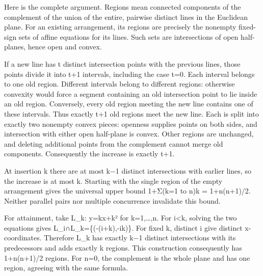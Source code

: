 \documentclass[11pt]{article}
\begin{document}
Here is the complete argument. Regions mean connected components of the complement of the union of the entire, pairwise distinct lines in the Euclidean plane. For an existing arrangement, its regions are precisely the nonempty fixed-sign sets of affine equations for its lines. Such sets are intersections of open half-planes, hence open and convex.

If a new line has t distinct intersection points with the previous lines, those points divide it into t+1 intervals, including the case t=0. Each interval belongs to one old region. Different intervals belong to different regions: otherwise convexity would force a segment containing an old intersection point to lie inside an old region. Conversely, every old region meeting the new line contains one of these intervals. Thus exactly t+1 old regions meet the new line. Each is split into exactly two nonempty convex pieces: openness supplies points on both sides, and intersection with either open half-plane is convex. Other regions are unchanged, and deleting additional points from the complement cannot merge old components. Consequently the increase is exactly t+1.

At insertion k there are at most k−1 distinct intersections with earlier lines, so the increase is at most k. Starting with the single region of the empty arrangement gives the universal upper bound 1+Σ(k=1 to n)k = 1+n(n+1)/2. Neither parallel pairs nor multiple concurrence invalidate this bound.

For attainment, take L\_k: y=kx+k² for k=1,…,n. For i\textless{}k, solving the two equations gives L\_i∩L\_k=\{(-(i+k),-ik)\}. For fixed k, distinct i give distinct x-coordinates. Therefore L\_k has exactly k−1 distinct intersections with its predecessors and adds exactly k regions. This construction consequently has 1+n(n+1)/2 regions. For n=0, the complement is the whole plane and has one region, agreeing with the same formula.
\end{document}
